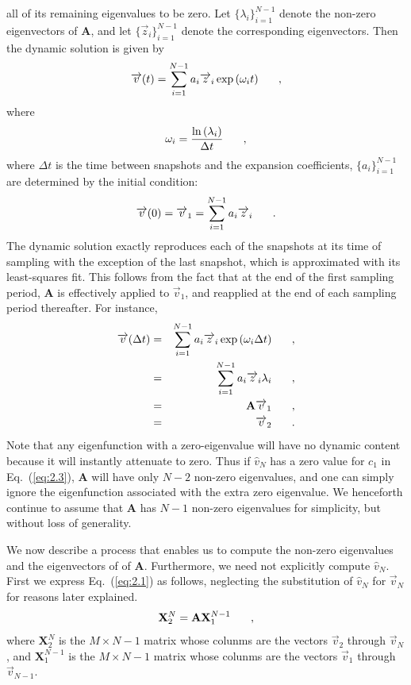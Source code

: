 \documentclass[12pt]{article}
\renewcommand{\vec}[1]{\overrightarrow{#1}}
\newcommand{\bea}{\begin{eqnarray}}
\newcommand{\eea}{\end{eqnarray}}
\newcommand{\be}{\begin{equation}}
\newcommand{\ee}{\end{equation}}
\newcommand{\pec}{\hspace{0.25in},}
\newcommand{\pep}{\hspace{0.25in}.}
\newcommand{\LEQ}[1]{\label{eq:#1}}
\newcommand{\EQ}[1]{Eq.~(\ref{eq:#1})}
\newcommand{\mA}{\mathbf{A}}
\newcommand{\mX}{\mathbf{X}}
\begin{document}
all of its remaining eigenvalues to be zero.  
Let $\{\lambda_i\}_{i=1}^{N-1}$ denote the non-zero eigenvectors of $\mA$, and let $\{\vec{z}_i\}_{i=1}^{N-1}$ denote the 
corresponding eigenvectors. Then the dynamic solution is given by 
\be
\vec{v}(t) = \sum_{i=1}^{N-1} a_i \vec{z}_i \exp{(\omega_i t)} \pec
\LEQ{2.5a}
\ee
where 
\be
\omega_i = \frac{\ln{(\lambda_i)}}{\Delta t} \pec
\LEQ{2.5b}
\ee
where $\Delta t$ is the time between snapshots and the expansion coefficients, $\{a_i\}_{i=1}^{N-1}$ are determined by the 
initial condition:
\be
\vec{v}(0) = \vec{v}_1 = \sum_{i=1}^{N-1} a_i \vec{z}_i \pep
\LEQ{2.5c}
\ee
The dynamic solution exactly reproduces each of the snapshots at its time of sampling with the 
exception of the last snapshot, which is approximated with its least-squares fit. This follows from the 
fact that at the end of the first sampling period, $\mA$ is effectively applied to $\vec{v}_1$, 
and reapplied at the end of each sampling period thereafter.  For instance, 
\bea
\vec{v}(\Delta t) &=& \sum_{i=1}^{N-1} a_i \vec{z}_i \exp{(\omega_i \Delta t)} \pec \nonumber \\
&=& \sum_{i=1}^{N-1} a_i \vec{z}_i \lambda_i \pec \nonumber \\ 
&=& \mA \vec{v}_1 \pec \nonumber \\ 
&=& \vec{v}_2 \pep
\LEQ{2.5d}
\eea 
Note that any eigenfunction with a zero-eigenvalue will have no dynamic content because it will 
instantly attenuate to zero.  Thus if $\widehat{v}_N$ has a zero value for $c_1$ in \EQ{2.3},
$\mA$ will have only $N-2$ non-zero eigenvalues, and one can simply ignore the eigenfunction associated 
with the extra zero eigenvalue.  We henceforth continue to assume that $\mA$ has $N-1$ non-zero eigenvalues 
for simplicity, but without loss of generality.

We now describe a process that enables us to compute the non-zero eigenvalues and the eigenvectors of 
of $\mA$.  Furthermore, we need not explicitly compute $\widehat{v}_N$.   First we 
express \EQ{2.1} as follows, neglecting the substitution of $\widehat{v}_N$ for $\vec{v}_N$ for reasons later explained. 
\be
\mX_2^{N} = \mA \mX_{1}^{N-1} \pec
\LEQ{2.6}
\ee
where $\mX_2^{N}$ is the $M \times N-1$ matrix whose colunms are the vectors $\vec{v}_2$ through $\vec{v}_{N}$, 
and $\mX_{1}^{N-1}$ is the $M\times N-1$ matrix whose colunms are the vectors $\vec{v}_1$ through 
$\vec{v}_{N-1}$. 
\end{document}
